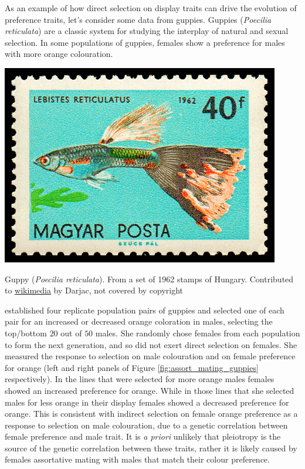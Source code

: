 As an example of how direct selection on display traits can drive the
evolution of preference traits, let's consider some data from
guppies. Guppies ({\it Poecilia reticulata}) are a classic system for
studying the interplay of natural and sexual selection. In some populations of
guppies, females show a preference for males with more orange colouration.\begin{marginfigure}
\begin{center}
\includegraphics[width=\textwidth]{illustration_images/Quant_gen/Guppies/1439_fish_40.png}  %
\end{center} \label{fig:assort_mating_guppies}
\caption{Guppy ({\it Poecilia reticulata}). \newline \noindent \tiny{From a set of 1962 stamps
  of Hungary. Contributed to \href{https://commons.wikimedia.org/wiki/File:1439_fish_40.png}{wikimedia} by Darjac, not covered by copyright}}
\end{marginfigure} 
 \citeauthor{houde:94} established four replicate
population pairs of guppies and selected one of each pair for an increased or decreased orange coloration in males, selecting the top/bottom $20$ out of $50$
males. She randomly chose females from each population to form the next generation, and so did not
exert direct selection on females. She measured the response to 
selection on male colouration and on female preference for orange (left
and right panels of Figure \ref{fig:assort_mating_guppies}
respectively). In the lines that were selected for more orange males
females showed an increased preference for orange. While in those
lines that she selected males for less orange in their display females
showed a decreased preference for orange. This is consistent with indirect selection on female orange preference as a response to
selection on male colouration, due to a genetic correlation between
female preference and male trait. It is {\it a priori} unlikely
that pleiotropy is the source of the genetic correlation between these
traits, rather it is likely caused by females assortative mating with
males that match their colour preference. 




